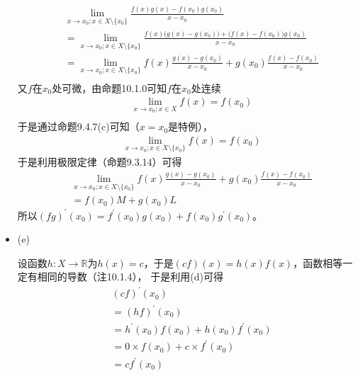 \documentclass{article}
\begin{document}
\begin{itemize}
        \begin{align*}
           & \lim\limits_{x \to x_0; x \in X \setminus \{x_0\}} \frac{f(x)g(x) - f(x_0)g(x_0)}{x - x_0} \\
           & = \lim\limits_{x \to x_0; x \in X \setminus \{x_0\}} \frac{f(x)\big(g(x) - g(x_0)\big)
          + \big(f(x) - f(x_0)\big)g(x_0)}{x - x_0}                                                     \\
           & = \lim\limits_{x \to x_0; x \in X \setminus \{x_0\}} f(x) \frac{g(x) - g(x_0)}{x - x_0}
          + g(x_0) \frac{f(x) - f(x_0)}{x - x_0}                                                        \\
        \end{align*}
        又$f$在$x_0$处可微，由命题10.1.0可知$f$在$x_0$处连续
        \begin{align*}
           & \lim\limits_{x \to x_0; x \in X} f(x) = f(x_0) \\
        \end{align*}
        于是通过命题9.4.7(c)可知（$x = x_0$是特例），
        \begin{align*}
           & \lim\limits_{x \to x_0; x \in X \setminus \{x_0\}} f(x) = f(x_0)
        \end{align*}
        于是利用极限定律（命题9.3.14）可得
        \begin{align*}
           & \lim\limits_{x \to x_0; x \in X \setminus \{x_0\}} f(x) \frac{g(x) - g(x_0)}{x - x_0}
          + g(x_0) \frac{f(x) - f(x_0)}{x - x_0}                                                   \\
           & = f(x_0)M + g(x_0)L
        \end{align*}
        所以$(fg)^\prime(x_0) = f^\prime(x_0)g(x_0) + f(x_0)g^\prime(x_0)$。

  \item (e)

        设函数$h : X \to \mathbb{R}$为$h(x) = c$，于是$(cf)(x) = h(x)f(x)$，函数相等一定有相同的导数（注10.1.4），
        于是利用(d)可得
        \begin{align*}
           & (cf)^\prime(x_0)                            \\
           & = (hf)^\prime(x_0)                          \\
           & = h^\prime(x_0)f(x_0) + h(x_0)f^\prime(x_0) \\
           & = 0 \times f(x_0) + c \times f^\prime(x_0)  \\
           & = cf^\prime(x_0)
        \end{align*}


\end{itemize}
\end{document}
